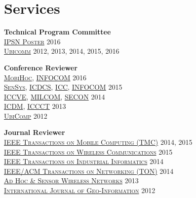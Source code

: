 \section{\sc Services}
{\bf Technical Program Committee}\\
{\href{http://ipsn.acm.org/2016/posters.html}{\textsc{IPSN Poster}}} \hfill 2016\\
{\href{http://www.iaria.org/conferences.html}{\textsc{Ubicomm}}} \hfill 2012, 2013, 2014, 2015, 2016\\
\vspace{-0.6cm}

{\bf Conference Reviewer}\\
{\href{http://www.sigmobile.org/mobihoc/2016/}{\textsc{MobiHoc}}}, {\href{http://infocom2016.ieee-infocom.org/}{\textsc{INFOCOM}}} \hfill 2016\\
{\href{http://sensys.acm.org/2015/}{\textsc{SenSys}}}, {\href{http://icdcs-2015.cse.ohio-state.edu/}{\textsc{ICDCS}}}, {\href{http://icc2015.ieee-icc.org/}{\textsc{ICC}}}, {\href{http://infocom2015.ieee-infocom.org/}{\textsc{INFOCOM}}} \hfill 2015\\
{\href{http://www.iccve.org/2014/}{\textsc{ICCVE}}}, {\href{http://www.milcom.org/2014/}{\textsc{MILCOM}}}, {\href{http://secon2014.ieee-secon.org}{\textsc{SECON}}} \hfill 2014\\
{\href{http://icdm2013.rutgers.edu}{\textsc{ICDM}}}, {\href{http://www.mnnit.ac.in/iccct2013}{\textsc{ICCCT}}} \hfill 2013\\
{\href{http://www.ubicomp.org/ubicomp2012}{\textsc{UbiComp}}} \hfill 2012\\
\vspace{-0.6cm}

{\bf Journal Reviewer}\\
{\href{http://www.computer.org/portal/web/tmc}{\textsc{IEEE Transactions on Mobile Computing (TMC)}}} \hfill 2014, 2015\\
{\href{http://www.comsoc.org/twc}{\textsc{IEEE Transactions on Wireless Communications}}} \hfill 2015\\
{\href{http://tii.ieee-ies.org}{\textsc{IEEE Transactions on Industrial Informatics}}} \hfill 2014\\
{\href{http://www.ifp.illinois.edu/ton}{\textsc{IEEE/ACM Transactions on Networking (TON)}}} \hfill 2014\\
{\href{http://www.oldcitypublishing.com/AHSWN/AHSWN.html}{\textsc{Ad Hoc \& Sensor Wireless Networks}}} \hfill 2013\\
{\href{http://www.mdpi.com/journal/ijgi}{\textsc{International Journal of Geo-Information}}} \hfill 2012\\
